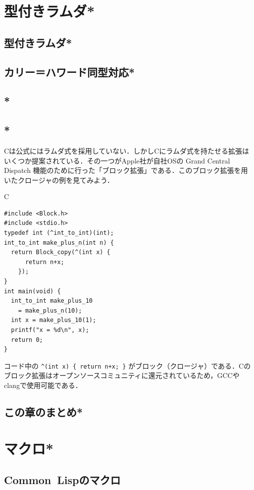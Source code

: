 \documentclass[a4paper,twocolumn]{jsbook}
\newcommand{\programminglanguage}[1]{\textsf{#1}}
\newcommand{\commonlisp}{\programminglanguage{Common~Lisp}}
\newcommand{\clang}{\programminglanguage{C}}
\newcommand{\code}[1]{\texttt{#1}}
\newenvironment{ccode}{\begin{itembox}[r]{\clang}}{\end{itembox}}
\begin{document}
\chapter{型付きラムダ*}
\section{型付きラムダ*}
\section{カリー＝ハワード同型対応*}
\section{*}
\section{*}

\clang は公式にはラムダ式を採用していない．しかし\clang にラムダ式を持たせる拡張はいくつか提案されている．その一つがApple社が自社OSの Grand Central Dispatch 機能のために行った「ブロック拡張」である．このブロック拡張を用いたクロージャの例を見てみよう．
\begin{ccode}
\begin{verbatim}
#include <Block.h>
#include <stdio.h>
typedef int (^int_to_int)(int);
int_to_int make_plus_n(int n) {
  return Block_copy(^(int x) {
      return n+x;
    });
}
int main(void) {
  int_to_int make_plus_10
    = make_plus_n(10);
  int x = make_plus_10(1);
  printf("x = %d\n", x);
  return 0;
}
\end{verbatim}
\end{ccode}
コード中の \code{\textasciicircum(int x) \{ return n+x; \}} がブロック（クロージャ）である．\clang のブロック拡張はオープンソースコミュニティに還元されているため，GCCやclangで使用可能である．

\section{この章のまとめ*}


\chapter{マクロ*}

\section{\commonlisp のマクロ}
\end{document}
